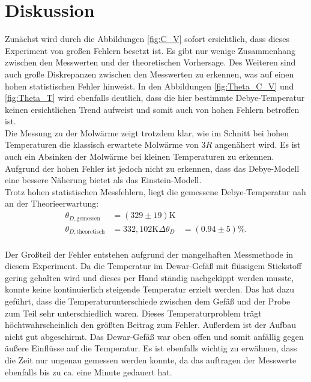 \section{Diskussion}
\label{sec:Diskussion}
Zunächst wird durch die Abbildungen \ref{fig:C_V} sofort ersichtlich, dass dieses Experiment von großen Fehlern besetzt ist. 
Es gibt nur wenige Zusammenhang zwischen den Messwerten und der theoretischen Vorhersage. Des Weiteren sind 
auch große Diskrepanzen zwischen den Messwerten zu erkennen, was auf einen hohen statistischen Fehler hinweist. In den Abbildungen 
\ref{fig:Theta_C_V} und \ref{fig:Theta_T} wird ebenfalls deutlich, dass die hier bestimmte Debye-Temperatur keinen ersichtlichen Trend aufweist 
und somit auch von hohen Fehlern betroffen ist. \\
Die Messung zu der Molwärme zeigt trotzdem klar, wie im Schnitt bei hohen Temperaturen die klassisch erwartete Molwärme von $3 R$ angenähert wird. 
Es ist auch ein Absinken der Molwärme bei kleinen Temperaturen zu erkennen. Aufgrund der hohen Fehler ist jedoch nicht zu erkennen, dass das Debye-Modell eine bessere Näherung 
bietet als das Einstein-Modell.  \\

Trotz hohen statistischen Messfehlern, liegt die gemessene Debye-Temperatur nah an der Theorieerwartung:
\begin{align*}
    \theta_{D,\text{gemessen}} &= (329 \pm 19) \si{\kelvin}\\
    \theta_{D,\text{theoretisch}} &= 332,102 \si{\kelvin}
    \Delta \theta_D &= (0.94\pm 5) \si{\%}.
\end{align*}
\\ 
Der Großteil der Fehler entstehen aufgrund der mangelhaften Messmethode in diesem Experiment. Da die Temperatur im Dewar-Gefäß mit flüssigem Stickstoff 
gering gehalten wird und dieses per Hand ständig nachgekippt werden musste, konnte keine kontinuierlich steigende Temperatur erzielt werden. 
Das hat dazu geführt, dass die Temperaturunterschiede zwischen dem Gefäß und der Probe zum Teil sehr unterschiedlich waren. 
Dieses Temperaturproblem trägt höchtwahrscheinlich den größten Beitrag zum Fehler. 
Außerdem ist der Aufbau nicht gut abgeschirmt. Das Dewar-Gefäß war oben offen und somit anfällig gegen äußere Einflüsse auf die Temperatur. 
Es ist ebenfalls wichtig zu erwähnen, dass die Zeit nur ungenau gemessen werden konnte, da das auftragen der Messwerte ebenfalls bis zu ca. eine Minute gedauert hat. 
